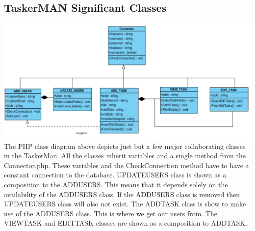 \documentclass{project}
\begin{document}
\subsection{TaskerMAN Significant Classes}
\includegraphics[width=1\textwidth, center]{images/Detailed-Design/TaskerMANClassDiagram} \\
The PHP class diagram above depicts just but a few major collaborating classes in the TaskerMan.  All the classes inherit variables and a single method from the Connector.php.  These variables and the CheckConnection method have to have a constant connection to the database. 
UPDATE\textunderscore USERS class is shown as a composition to the ADD\textunderscore USERS.  This means that it depends solely on the availability of the ADD\textunderscore USERS class.  If the ADD\textunderscore USERS class is removed then UPDATE\textunderscore USERS class will also not exist.
The ADD\textunderscore TASK class is show to make use of the ADD\textunderscore USERS class.  This is where we get our users from.  The VIEW\textunderscore TASK and EDIT\textunderscore TASK   classes are shown as a composition to ADD\textunderscore TASK.
\end{document}
